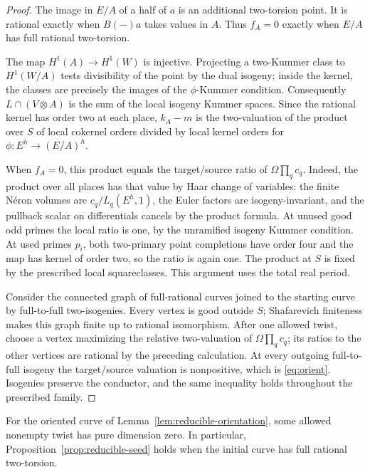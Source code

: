 \begin{proof}
The image in \(E/A\) of a half of \(a\) is an additional two-torsion point.
It is rational exactly when \(B(-)a\) takes values in \(A\).  Thus
\(f_A=0\) exactly when \(E/A\) has full rational two-torsion.

The map \(H^1(A)\to H^1(W)\) is injective.  Projecting a two-Kummer class
to \(H^1(W/A)\) tests divisibility of the point by the dual isogeny;
inside the kernel, the classes are precisely the images of the
\(\phi\)-Kummer condition.  Consequently \(L\cap(V\otimes A)\) is the
sum of the local isogeny Kummer spaces.  Since the rational kernel has
order two at each place, \(k_A-m\) is the two-valuation of the product
over \(S\) of local cokernel orders divided by local kernel orders for
\(\phi:E^h\to(E/A)^h\).

When \(f_A=0\), this product equals the target/source ratio of
\(\Omega\prod_q c_q\).  Indeed, the product over all places has that
value by Haar change of variables: the finite N\'eron volumes are
\(c_q/L_q(E^h,1)\), the Euler factors are isogeny-invariant, and the
pullback scalar on differentials cancels by the product formula.  At
unused good odd primes the local ratio is one, by the unramified isogeny
Kummer condition.  At used primes \(p_i\), both two-primary point
completions have order four and the map has kernel of order two, so the
ratio is again one.  The product at \(S\) is fixed by the prescribed
local squareclasses.  This argument uses the total real period.

Consider the connected graph of full-rational curves joined to the
starting curve by full-to-full two-isogenies.  Every vertex is good
outside \(S\); Shafarevich finiteness makes this graph finite up to
rational isomorphism.  After one allowed twist, choose a vertex maximizing
the relative two-valuation of \(\Omega\prod_q c_q\); its ratios to the
other vertices are rational by the preceding calculation.  At every
outgoing full-to-full isogeny the target/source valuation is nonpositive,
which is \eqref{eq:orient}.  Isogenies preserve the conductor, and the
same inequality holds throughout the prescribed family.
\end{proof}

\begin{lemma}\label{lem:reducible-full-seed}
For the oriented curve of Lemma~\ref{lem:reducible-orientation}, some
allowed nonempty twist has pure dimension zero.  In particular,
Proposition~\ref{prop:reducible-seed} holds when the initial curve has full
rational two-torsion.
\end{lemma}

